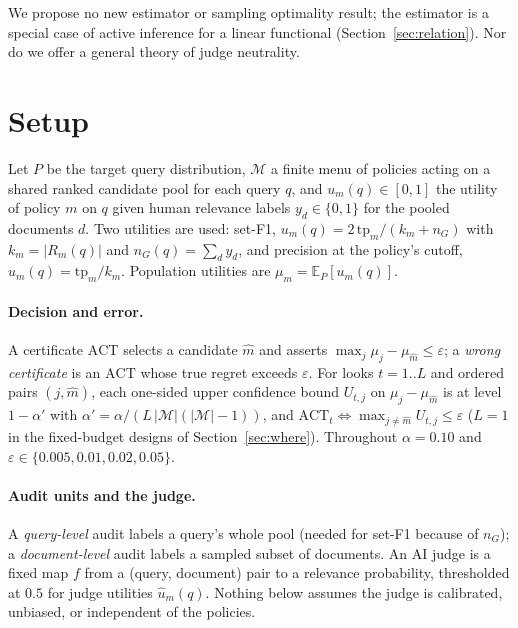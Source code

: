 \documentclass{article}
\newcommand{\eps}{\varepsilon}
\newcommand{\ACT}{\mathrm{ACT}}
\begin{document}
We propose no new estimator or sampling optimality result; the estimator is a special case of active inference for a linear functional (Section~\ref{sec:relation}). Nor do we offer a general theory of judge neutrality.

\section{Setup}\label{sec:setup}
Let $P$ be the target query distribution, $\mathcal{M}$ a finite menu of policies acting on a shared ranked candidate pool for each query $q$, and $u_m(q)\in[0,1]$ the utility of policy $m$ on $q$ given human relevance labels $y_d\in\{0,1\}$ for the pooled documents $d$. Two utilities are used: set-F1, $u_m(q)=2\,\mathrm{tp}_m/(k_m+n_G)$ with $k_m=|R_m(q)|$ and $n_G(q)=\sum_d y_d$, and precision at the policy's cutoff, $u_m(q)=\mathrm{tp}_m/k_m$. Population utilities are $\mu_m=\mathbb{E}_P[u_m(q)]$.

\paragraph{Decision and error.} A certificate $\ACT$ selects a candidate $\hat m$ and asserts $\max_{j}\mu_j-\mu_{\hat m}\le\eps$; a \emph{wrong certificate} is an $\ACT$ whose true regret exceeds $\eps$. For looks $t=1..L$ and ordered pairs $(j,\hat m)$, each one-sided upper confidence bound $U_{t,j}$ on $\mu_j-\mu_{\hat m}$ is at level $1-\alpha'$ with $\alpha'=\alpha/(L\,|\mathcal M|(|\mathcal M|-1))$, and $\ACT_t\iff\max_{j\ne\hat m}U_{t,j}\le\eps$ ($L=1$ in the fixed-budget designs of Section~\ref{sec:where}). Throughout $\alpha=0.10$ and $\eps\in\{0.005,0.01,0.02,0.05\}$.

\paragraph{Audit units and the judge.} A \emph{query-level} audit labels a query's whole pool (needed for set-F1 because of $n_G$); a \emph{document-level} audit labels a sampled subset of documents. An AI judge is a fixed map $f$ from a (query, document) pair to a relevance probability, thresholded at $0.5$ for judge utilities $\hat u_m(q)$. Nothing below assumes the judge is calibrated, unbiased, or independent of the policies.
\end{document}

